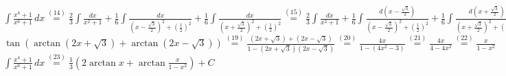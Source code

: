 	\newline
	$\int{\frac{x^4+1}{x^6+1}\, dx} \stackrel{(14)}{=} \frac{2}{3}\int{\frac{dx}{x^2+1}}   + 
	\frac{1}{6}\int{\frac{dx}{(x-\frac{\sqrt{3}}{2})^2+(\frac{1}{2})^2}}  + \frac{1}{6}
	\int{\frac{dx}{(x+\frac{\sqrt{3}}{2})^2+(\frac{1}{2})^2}}\stackrel{(15)}{=} \frac{2}{3}\int{\frac{dx}{x^2+1}}   + 
	\frac{1}{6}\int{\frac{d(x-\frac{\sqrt{3}}{2})}{(x-\frac{\sqrt{3}}{2})^2+(\frac{1}{2})^2}}  + \frac{1}{6}
	\int{\frac{d(x+\frac{\sqrt{3}}{2})}{(x+\frac{\sqrt{3}}{2})^2+(\frac{1}{2})^2}}  \stackrel{(16)}{=} \frac{2}{3} \arctan x + \frac{1}{6} \cdot \frac{1}{\frac{1}{2}} \arctan \frac{x-\frac{\sqrt{3}}{2}}{\frac{1}{2}} + \frac{1}{6} \cdot \frac{1}{\frac{1}{2}} \arctan \frac{x+\frac{\sqrt{3}}{2}}{\frac{1}{2}} + C\stackrel{(17)}{=} \frac{2}{3} \arctan x + \frac{1}{3}  \arctan (2x+\sqrt{3}) + \frac{1}{3} \arctan (2x-\sqrt{3}) + C \stackrel{(18)}{=} \frac{1}{3} (2 \arctan x +   \arctan (2x+\sqrt{3}) +  \arctan (2x-\sqrt{3})) + C$ 
	\newline
	$\tan(\arctan (2x+\sqrt{3}) +  \arctan (2x-\sqrt{3})) \stackrel{(19)}{=} \frac{(2x+\sqrt{3})+(2x-\sqrt{3})}{1-(2x+\sqrt{3})(2x-\sqrt{3})}\stackrel{(20)}{=} 
	\frac{4x}{1-(4x^2-3)} \stackrel{(21)}{=} \frac{4x}{4-4x^2} \stackrel{(22)}{=} \frac{x}{1-x^2}$
	\newline
	$\int{\frac{x^4+1}{x^6+1}\, dx} \stackrel{(23)}{=} \frac{1}{3} (2 \arctan x +   \arctan \frac{x}{1-x^2}) + C$
